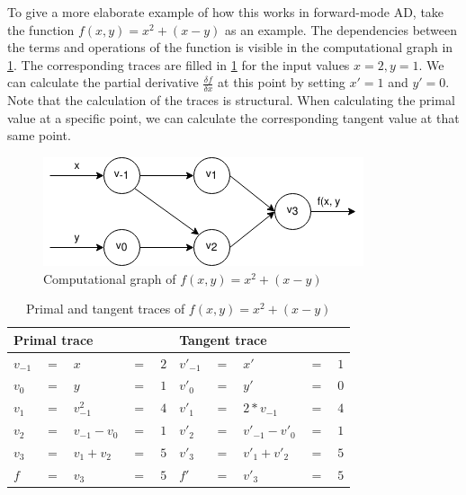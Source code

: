 To give a more elaborate example of how this works in forward-mode AD, take the function $f(x, y) = x^2 + (x - y)$ as an example.
The dependencies between the terms and operations of the function is visible in the computational graph in \cref{fig:func_trace}.
The corresponding traces are filled in \cref{table:func_trace} for the input values $x = 2, y = 1$.
We can calculate the partial derivative $\frac{\delta f}{\delta x}$ at this point by setting $x' = 1$ and $y' = 0$.
Note that the calculation of the traces is structural.
When calculating the primal value at a specific point, we can calculate the corresponding tangent value at that same point.

\begin{figure}
  \centering
  \includegraphics[scale=0.6]{./assets/function_trace.png}
  \caption{Computational graph of $f(x, y) = x^2 + (x - y)$}
  \label{fig:func_trace}
\end{figure}

\begin{table}
  \begin{center}
    \begin{tabular}{ l l l l l | l l l l l }
      \hline
      \multicolumn{5}{l}{Primal trace} & \multicolumn{5}{l}{Tangent trace} \\
      \hline
$v_{-1} $&$=$&$x$&$=$&$2$             &$v'_{-1}$&$=$&$x'$&$=$&$1$ \\
$v_0    $&$=$&$y$&$=$&$1$             &$v'_{0}$&$=$&$y'$&$=$&$0$ \\
      \hline
$v_1    $&$=$&$v_{-1}^2$&$=$&$4$      &$v'_{1}$&$=$&$2*v_{-1}$&$=$&$4$ \\
$v_2    $&$=$&$v_{-1} - v_{0}$&$=$&$1$&$v'_{2}$&$=$&$v'_{-1}-v'_{0}$&$=$&$1$ \\
$v_3    $&$=$&$v_1 + v_2$&$=$&$5$     &$v'_{3}$&$=$&$v'_1 + v'_2$&$=$&$5$ \\
      \hline
$f      $&$=$&$v_3$&$=$&$5$           &$f'$&$=$&$v'_3$&$=$&$5$ \\
      \hline
    \end{tabular}
  \end{center}
  \caption{Primal and tangent traces of $f(x, y) = x^2 + (x - y)$}
  \label{table:func_trace}
\end{table}

